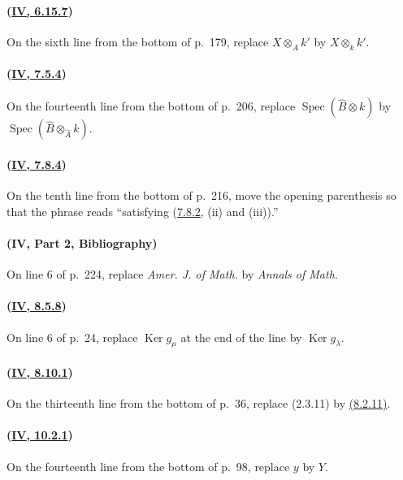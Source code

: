 \paragraph{({\texorpdfstring{\protect\hyperref[IV.6.15.7]{\textbf{IV}, 6.15.7}}{IV, 6.15.7}})}
On the sixth line from the bottom of p.~179, replace
$X\otimes_Ak'$ by $X\otimes_kk'$.

\paragraph{({\texorpdfstring{\protect\hyperref[IV.7.5.4]{\textbf{IV}, 7.5.4}}{IV, 7.5.4}})}
On the fourteenth line from the bottom of p.~206, replace
$\operatorname{Spec}(\widehat B\otimes k)$ by
$\operatorname{Spec}(\widehat B\otimes_{\widehat A}k)$.

\paragraph{({\texorpdfstring{\protect\hyperref[IV.7.8.4]{\textbf{IV}, 7.8.4}}{IV, 7.8.4}})}
On the tenth line from the bottom of p.~216, move the opening parenthesis
so that the phrase reads ``satisfying ({\hyperref[IV.7.8.2]{7.8.2}}, (ii) and (iii)).''

\paragraph{(\textbf{IV}, Part 2, Bibliography)}
On line 6 of p.~224, replace \emph{Amer. J. of Math.} by
\emph{Annals of Math.}

\paragraph{({\texorpdfstring{\protect\hyperref[IV.8.5.8]{\textbf{IV}, 8.5.8}}{IV, 8.5.8}})}
On line 6 of p.~24, replace $\operatorname{Ker}g_\mu$ at the end of the
line by $\operatorname{Ker}g_\lambda$.

\paragraph{({\texorpdfstring{\protect\hyperref[IV.8.10.1]{\textbf{IV}, 8.10.1}}{IV, 8.10.1}})}
On the thirteenth line from the bottom of p.~36, replace (2.3.11) by
{\hyperref[IV.8.2.11]{(8.2.11)}}.

\paragraph{({\texorpdfstring{\protect\hyperref[IV.10.2.1]{\textbf{IV}, 10.2.1}}{IV, 10.2.1}})}
On the fourteenth line from the bottom of p.~98, replace $y$ by $Y$.

